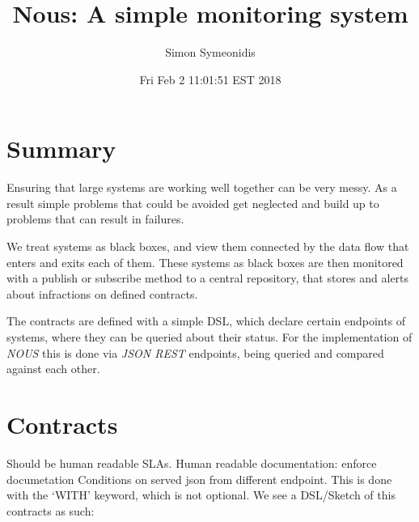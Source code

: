 \documentclass[12pt,twoside]{article}
\title{Nous: A simple monitoring system}
\author{Simon Symeonidis}
\date{Fri Feb  2 11:01:51 EST 2018}
\begin{document}
\maketitle
\tableofcontents
\listoffigures
\lstlistoflistings



\section{Summary}
Ensuring that large systems are working well together can be
very messy. As a result simple problems that could be avoided
get neglected and build up to problems that can result in
failures.

We treat systems as black boxes, and view them connected by
the data flow that enters and exits each of them. These systems as
black boxes are then monitored with a publish or subscribe method to a
central repository, that stores and alerts about infractions on
defined contracts.

The contracts are defined with a simple DSL, which declare certain
endpoints of systems, where they can be queried about their
status. For the implementation of \textit{NOUS} this is done via
\textit{JSON REST} endpoints, being queried and compared against each
other.

\section{Contracts}
Should be human readable SLAs. Human readable documentation: enforce
documetation Conditions on served json from different endpoint. This
is done with the `WITH' keyword, which is not optional. We see a
DSL/Sketch of this contracts as such:

\end{document}

